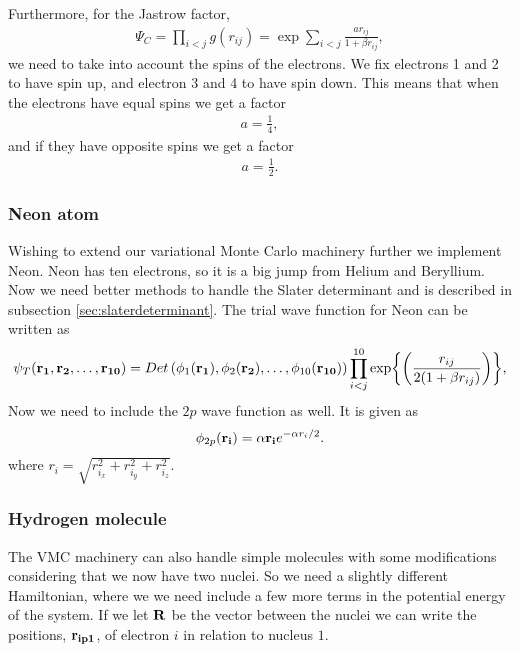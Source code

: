		Furthermore, for the Jastrow factor,
		\begin{align}
			\Psi_{C}=\prod_{i<j}g(r_{ij})=\exp{\sum_{i<j}\frac{ar_{ij}}{1+\beta r_{ij}}},
		\end{align}
		we need to take into account the spins of the electrons. We fix electrons
		1 and 2 to have spin up, and electron 3 and 4 to have spin down. This
		means that when the electrons have equal spins we get a factor
		\begin{align}
			a=\frac{1}{4},
		\end{align}
		and if they have opposite spins we get a factor
		\begin{align}
			a=\frac{1}{2}.
		\end{align}

	\subsubsection{Neon atom}

		Wishing to extend our variational Monte Carlo machinery further we implement Neon. Neon has ten electrons, so it is a big jump from Helium and Beryllium. Now we need better methods to handle the Slater determinant and is described in subsection \ref{sec:slaterdeterminant}. The trial wave function for Neon can be written as
		\begin{equation}
		   \psi_{T}({\bf r_1},{\bf r_2}, \dots,{\bf r_{10}}) =
		   Det\left(\phi_{1}({\bf r_1}),\phi_{2}({\bf r_2}),
		   \dots,\phi_{10}({\bf r_{10}})\right)
		   \prod_{i<j}^{10}\exp{\left(\frac{r_{ij}}{2(1+\beta r_{ij})}\right)},
		   \label{eq:NeonTrialFunction}
		\end{equation}
		Now we need to include the $2p$ wave function as well. It is given as
		\begin{equation}
			\phi_{2p}({\bf r_i}) = \alpha {\bf r_i}e^{-\alpha r_i/2}.
		\end{equation}
		where $ {r_i} = \sqrt{r_{i_x}^2+r_{i_y}^2+r_{i_z}^2}$.



	\subsubsection{Hydrogen molecule}
		The VMC machinery can also handle simple molecules with some modifications considering that we now have two nuclei. So we need a slightly different Hamiltonian, where we we need include a few more terms in the potential energy of the system. If we let \(\vb{R}\) be the vector between the nuclei we can write the positions, \(\vb{r_{ip1}}\), of electron \(i\) in relation to nucleus \(1\).

